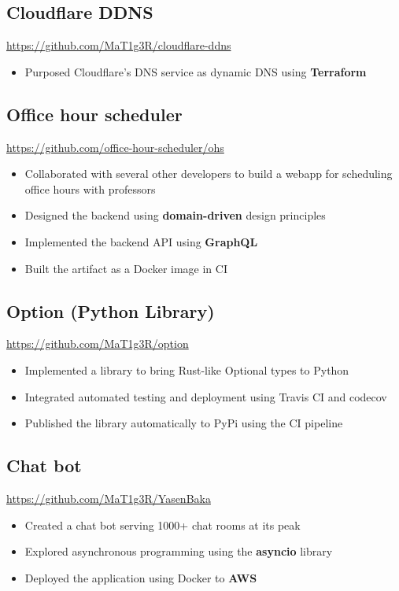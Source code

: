 \documentclass[letterpaper,12pt,oneside]{article}
\newcommand{\smallurl}[1]{\footnotesize{\url{#1}}\normalsize}
\begin{document}
\subsection*{Cloudflare DDNS \hfill {}}
\smallurl{https://github.com/MaT1g3R/cloudflare-ddns}
\begin{itemize}
      \setlength\itemsep{0em}
      \item Purposed Cloudflare's DNS service as dynamic DNS using \textbf{Terraform}
\end{itemize}

\subsection*{Office hour scheduler \hfill {}}
\smallurl{https://github.com/office-hour-scheduler/ohs}
\begin{itemize}
      \setlength\itemsep{0em}
      \item Collaborated with several other developers to build a webapp for scheduling office hours with professors
      \item Designed the backend using \textbf{domain-driven} design principles
      \item Implemented the backend API using \textbf{GraphQL}
      \item Built the artifact as a Docker image in CI
\end{itemize}

\subsection*{Option (Python Library) \hfill {}}
\smallurl{https://github.com/MaT1g3R/option}
\begin{itemize}
      \setlength\itemsep{0em}
      \item Implemented a library to bring Rust-like Optional types to Python
      \item Integrated automated testing and deployment using Travis CI and codecov
      \item Published the library automatically to PyPi using the CI pipeline
\end{itemize}

\subsection*{Chat bot \hfill {}}
\smallurl{https://github.com/MaT1g3R/YasenBaka}
\begin{itemize}
      \setlength\itemsep{0em}
      \item Created a chat bot serving 1000+ chat rooms at its peak
      \item Explored asynchronous programming using the \textbf{asyncio} library
      \item Deployed the application using Docker to \textbf{AWS}
\end{itemize}
\end{document}
